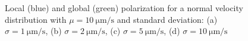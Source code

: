 \documentclass[../../master_thesis_np.tex]{subfiles}
\begin{document}
		\begin{figure}[htp]
			\centering\
			\\
			\\
			
			\caption{Local (blue) and global (green) polarization for a normal velocity distribution with $\mu = \SI{10}{\um\per\second}$ and standard deviation: (a) $\sigma = \SI{1}{\um\per\second}$, (b) $\sigma = \SI{2}{\um\per\second}$, (c) $\sigma = \SI{5}{\um\per\second}$, (d) $\sigma = \SI{10}{\um\per\second}$}
			\label{fig:lj_vdist_pol}
		\end{figure}
		
\end{document}
